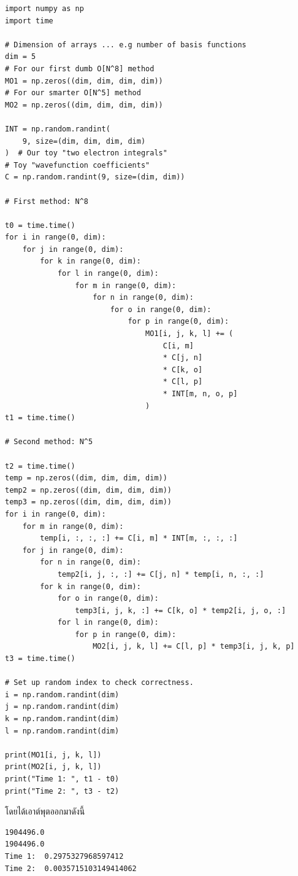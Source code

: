 \vspace{5pt}

\begin{lstlisting}[style=MyPython]
import numpy as np
import time

# Dimension of arrays ... e.g number of basis functions
dim = 5
# For our first dumb O[N^8] method
MO1 = np.zeros((dim, dim, dim, dim))  
# For our smarter O[N^5] method
MO2 = np.zeros((dim, dim, dim, dim))  

INT = np.random.randint(
    9, size=(dim, dim, dim, dim)
)  # Our toy "two electron integrals"
# Toy "wavefunction coefficients"
C = np.random.randint(9, size=(dim, dim))  

# First method: N^8

t0 = time.time()
for i in range(0, dim):
    for j in range(0, dim):
        for k in range(0, dim):
            for l in range(0, dim):
                for m in range(0, dim):
                    for n in range(0, dim):
                        for o in range(0, dim):
                            for p in range(0, dim):
                                MO1[i, j, k, l] += (
                                    C[i, m]
                                    * C[j, n]
                                    * C[k, o]
                                    * C[l, p]
                                    * INT[m, n, o, p]
                                )
t1 = time.time()

# Second method: N^5

t2 = time.time()
temp = np.zeros((dim, dim, dim, dim))
temp2 = np.zeros((dim, dim, dim, dim))
temp3 = np.zeros((dim, dim, dim, dim))
for i in range(0, dim):
    for m in range(0, dim):
        temp[i, :, :, :] += C[i, m] * INT[m, :, :, :]
    for j in range(0, dim):
        for n in range(0, dim):
            temp2[i, j, :, :] += C[j, n] * temp[i, n, :, :]
        for k in range(0, dim):
            for o in range(0, dim):
                temp3[i, j, k, :] += C[k, o] * temp2[i, j, o, :]
            for l in range(0, dim):
                for p in range(0, dim):
                    MO2[i, j, k, l] += C[l, p] * temp3[i, j, k, p]
t3 = time.time()

# Set up random index to check correctness.
i = np.random.randint(dim)
j = np.random.randint(dim)
k = np.random.randint(dim)
l = np.random.randint(dim)

print(MO1[i, j, k, l])
print(MO2[i, j, k, l])
print("Time 1: ", t1 - t0)
print("Time 2: ", t3 - t2)
\end{lstlisting}
%
\vspace{5pt}
%
โดยได้เอาต์พุตออกมาดังนี้
%
\vspace{5pt}
%
\begin{lstlisting}
1904496.0
1904496.0
Time 1:  0.2975327968597412
Time 2:  0.0035715103149414062
\end{lstlisting}

